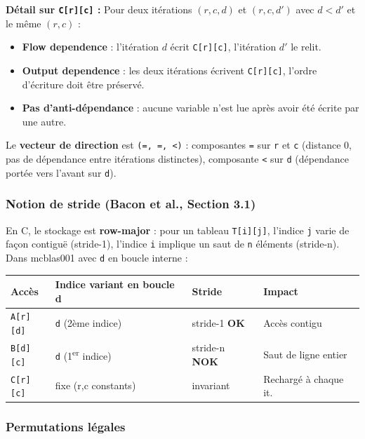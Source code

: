 \documentclass[a4paper,11pt]{article}
\newcommand{\code}[1]{\texttt{\color{CodeRed}#1}}
\newcommand{\result}[1]{\textbf{\color{GreenBorder}#1}}
\begin{document}
\textbf{D\'etail sur \code{C[r][c]} :} Pour deux it\'erations $(r,c,d)$ et $(r,c,d')$
avec $d < d'$ et le m\^eme $(r,c)$ :
\begin{itemize}[leftmargin=1.5em]
  \item \textbf{Flow dependence} : l'it\'eration $d$ \'ecrit \code{C[r][c]}, l'it\'eration $d'$ le relit.
  \item \textbf{Output dependence} : les deux it\'erations \'ecrivent \code{C[r][c]}, l'ordre d'\'ecriture doit \^etre pr\'eserv\'e.
  \item \textbf{Pas d'anti-d\'ependance} : aucune variable n'est lue apr\`es avoir \'et\'e \'ecrite par une autre.
\end{itemize}

Le \textbf{vecteur de direction} est \texttt{(=, =, <)} : composantes \texttt{=} sur
\code{r} et \code{c} (distance 0, pas de d\'ependance entre it\'erations distinctes),
composante \texttt{<} sur \code{d} (d\'ependance port\'ee vers l'avant sur \code{d}).

\subsubsection{Notion de stride (Bacon et al., Section 3.1)}

En C, le stockage est \textbf{row-major} : pour un tableau \code{T[i][j]}, l'indice
\code{j} varie de fa\c{c}on contiguë (stride-1), l'indice \code{i} implique un saut de
\code{n} \'el\'ements (stride-n). Dans mcblas001 avec \code{d} en boucle interne :

\begin{center}
\begin{tabular}{L{2.5cm}C{3.5cm}C{2.5cm}L{4cm}}
  \toprule
  \textbf{Acc\`es} & \textbf{Indice variant en boucle d} & \textbf{Stride} & \textbf{Impact} \\
  \midrule
  \code{A[r][d]} & \code{d} (2\`eme indice) & stride-1 \result{OK} & Acc\`es contigu \\
  \code{B[d][c]} & \code{d} (1\textsuperscript{er} indice) & stride-n \textbf{NOK} & Saut de ligne entier \\
  \code{C[r][c]} & fixe (r,c constants)  & invariant & Recharg\'e \`a chaque it. \\
  \bottomrule
\end{tabular}
\end{center}

\subsubsection{Permutations l\'egales}
\end{document}
